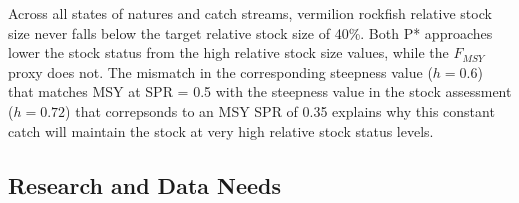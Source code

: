 \documentclass[11pt,
  english,
  a4paper,
]{article}
\begin{document}
\leavevmode\tagmcend\tagstructend\par


Across all states of natures and catch streams, vermilion rockfish relative stock size never falls below the target relative stock size of 40\%. Both P* approaches lower the stock status from the high relative stock size values, while the {\(F_{MSY}\)\leavevmode\tagmcend\tagstructend} proxy does not. The mismatch in the corresponding steepness value ({\(h=0.6\)\leavevmode\tagmcend\tagstructend}) that matches MSY at SPR = 0.5 with the steepness value in the stock assessment ({\(h=0.72\)\leavevmode\tagmcend\tagstructend}) that correpsonds to an MSY SPR of 0.35 explains why this constant catch will maintain the stock at very high relative stock status levels.

\leavevmode\tagmcend\tagstructend\par

\clearpage



\clearpage


\hypertarget{research-and-data-needs}{%
\subsection*{Research and Data Needs}\label{research-and-data-needs}}

\leavevmode\tagmcend\tagstructend

\end{document}
